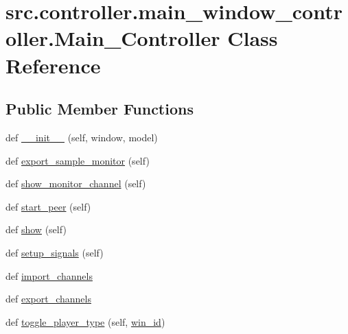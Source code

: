 \hypertarget{classsrc_1_1controller_1_1main__window__controller_1_1Main__Controller}{}\section{src.\+controller.\+main\+\_\+window\+\_\+controller.\+Main\+\_\+\+Controller Class Reference}
\label{classsrc_1_1controller_1_1main__window__controller_1_1Main__Controller}
\subsection*{Public Member Functions}
\begin{DoxyCompactItemize}
\item 
def \hyperlink{classsrc_1_1controller_1_1main__window__controller_1_1Main__Controller_a52d7589f44db394016d96c594f5cecdd}{\+\_\+\+\_\+init\+\_\+\+\_\+} (self, window, model)
\item 
def \hyperlink{classsrc_1_1controller_1_1main__window__controller_1_1Main__Controller_a1fa29af8cfb2631e8cf8800be1b7f178}{export\+\_\+sample\+\_\+monitor} (self)
\item 
def \hyperlink{classsrc_1_1controller_1_1main__window__controller_1_1Main__Controller_a189d0d3e9985f5eb749673e90f37a3ee}{show\+\_\+monitor\+\_\+channel} (self)
\item 
def \hyperlink{classsrc_1_1controller_1_1main__window__controller_1_1Main__Controller_ab7264805bcee4ecf770fc38bf788949d}{start\+\_\+peer} (self)
\item 
def \hyperlink{classsrc_1_1controller_1_1main__window__controller_1_1Main__Controller_a27fb26c5e650e47052c4ef26bc6efc03}{show} (self)
\item 
def \hyperlink{classsrc_1_1controller_1_1main__window__controller_1_1Main__Controller_ad044b9b8e5113bebd642ad605bf52fc2}{setup\+\_\+signals} (self)
\item 
def \hyperlink{classsrc_1_1controller_1_1main__window__controller_1_1Main__Controller_a1726bd2bbc6ed953237d8c590051d6d8}{import\+\_\+channels}
\item 
def \hyperlink{classsrc_1_1controller_1_1main__window__controller_1_1Main__Controller_a0354392bbaa3516eb03a3ad69981054d}{export\+\_\+channels}
\item 
def \hyperlink{classsrc_1_1controller_1_1main__window__controller_1_1Main__Controller_a261d6830a754581570c4f6dd7407d1a8}{toggle\+\_\+player\+\_\+type} (self, \hyperlink{classsrc_1_1controller_1_1main__window__controller_1_1Main__Controller_ad15c49dcab2e7227f2708e253aedebe9}{win\+\_\+id})

\end{DoxyCompactItemize}
